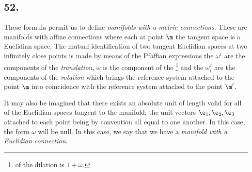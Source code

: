 \subsection*{52.}

These formula permit us to define \textit{manifolds with a metric connections}. These are manifolds with affine connections where each at point $\m$ the tangent space is a Euclidian space. The mutual identification of two tangent Euclidian spaces at two infinitely close points is made by means of the Pfaffian expressions
the $\omega^i$ are the components of the \textit{translation}, $\omega$ is the component of the \footnote{ of the dilation is $1 + \omega$.} and the $\omega_i^j$ are the components of the \textit{rotation} which brings the reference system attached to the point $\m$ into coincidence with the reference system attached to the point $\m'$.

It may also be imagined that there exists an absolute unit of length valid for all of the Euclidian spaces tangent to the manifold; the unit vectors $\e_1, \e_2, \e_3$ attached to each point being by convention all equal to one another. In this case, the form $\omega$ will be null. In this case, we say that we have a \textit{manifold with a Euclidian connection}. 